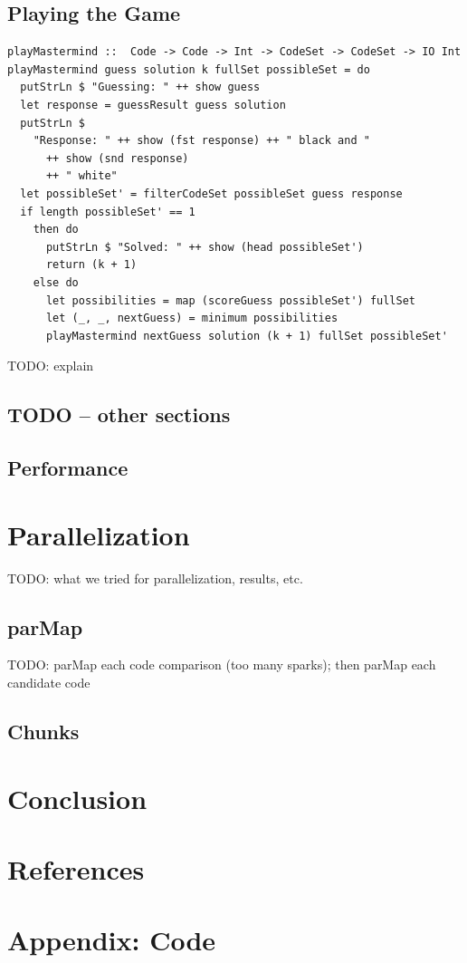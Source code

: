 \documentclass{article}
\begin{document}
\subsection{Playing the Game}
\begin{verbatim}
playMastermind ::  Code -> Code -> Int -> CodeSet -> CodeSet -> IO Int
playMastermind guess solution k fullSet possibleSet = do
  putStrLn $ "Guessing: " ++ show guess
  let response = guessResult guess solution
  putStrLn $
    "Response: " ++ show (fst response) ++ " black and "
      ++ show (snd response)
      ++ " white"
  let possibleSet' = filterCodeSet possibleSet guess response
  if length possibleSet' == 1
    then do
      putStrLn $ "Solved: " ++ show (head possibleSet')
      return (k + 1)
    else do
      let possibilities = map (scoreGuess possibleSet') fullSet
      let (_, _, nextGuess) = minimum possibilities
      playMastermind nextGuess solution (k + 1) fullSet possibleSet'
\end{verbatim}
TODO: explain

\subsection{TODO -- other sections}
\subsection{Performance}

\section{Parallelization}
TODO: what we tried for parallelization, results, etc.
\subsection{parMap}
TODO: parMap each code comparison (too many sparks); then parMap each candidate code
\subsection{Chunks}

\section{Conclusion}

\section{References}

\section{Appendix: Code}
\end{document}
